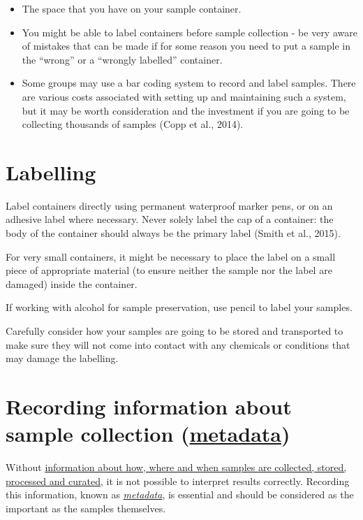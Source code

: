 \documentclass[12pt,a4paper,oneside]{report}
\providecommand{\tightlist}{%
  \setlength{\itemsep}{0pt}\setlength{\parskip}{0pt}}
\begin{document}
\begin{itemize}
\tightlist
\item
  The space that you have on your sample container.
\item
  You might be able to label containers before sample collection - be
  very aware of mistakes that can be made if for some reason you need to
  put a sample in the ``wrong'' or a ``wrongly labelled'' container.
\item
  Some groups may use a bar coding system to record and label samples.
  There are various costs associated with setting up and maintaining
  such a system, but it may be worth consideration and the investment if
  you are going to be collecting thousands of samples (Copp et al.,
  2014).
\end{itemize}

\hypertarget{labelling}{%
\section{Labelling}\label{labelling}}

Label containers directly using permanent waterproof marker pens, or on
an adhesive label where necessary. Never solely label the cap of a
container: the body of the container should always be the primary label
(Smith et al., 2015).

For very small containers, it might be necessary to place the label on a
small piece of appropriate material (to ensure neither the sample nor
the label are damaged) inside the container.

If working with alcohol for sample preservation, use pencil to label
your samples.

Carefully consider how your samples are going to be stored and
transported to make sure they will not come into contact with any
chemicals or conditions that may damage the labelling.

\hypertarget{recording-information-about-sample-collection-metadata}{%
\section{\texorpdfstring{Recording information about sample collection
(\protect\hyperlink{metadata}{metadata})}{Recording information about sample collection (metadata)}}\label{recording-information-about-sample-collection-metadata}}

Without \protect\hyperlink{metadata}{information about how, where and
when samples are collected, stored, processed and curated}, it is not
possible to interpret results correctly. Recording this information,
known as \protect\hyperlink{metadata}{\emph{metadata}}, is essential and
should be considered as the important as the samples themselves.
\end{document}
